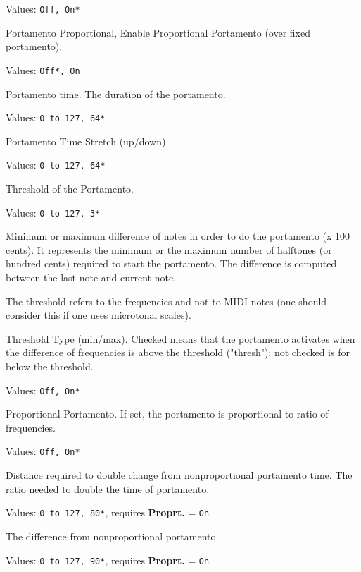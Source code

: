    Values: \texttt{Off, On*}

   Portamento Proportional,
   Enable Proportional Portamento (over fixed portamento).

   Values: \texttt{Off*, On}

   Portamento time.
   The duration of the portamento.

   Values: \texttt{0 to 127, 64*}

   Portamento Time Stretch (up/down).

   Values: \texttt{0 to 127, 64*}

   Threshold of the Portamento.

   Values: \texttt{0 to 127, 3*}

   Minimum or maximum difference of notes in order
   to do the portamento (x 100 cents).
   It represents the minimum or the maximum number of halftones (or hundred
   cents) required to start the portamento. The difference is computed
   between the last note and current note.

   The threshold refers to the frequencies and not to MIDI notes (one should
   consider this if one uses microtonal scales).

   Threshold Type (min/max).
   Checked means that the portamento activates when the difference of
   frequencies is above the threshold ("thresh"); not checked is for below
   the threshold.

   Values: \texttt{Off, On*}

   Proportional Portamento.
   If set, the portamento is proportional to ratio of frequencies.

   Values: \texttt{Off, On*}

   Distance required to double change from nonproportional
   portamento time.
   The ratio needed to double the time of portamento.

   Values: \texttt{0 to 127, 80*}, requires \textbf{Proprt.} = \texttt{On}

   The difference from nonproportional portamento.

   Values: \texttt{0 to 127, 90*}, requires \textbf{Proprt.} = \texttt{On}

